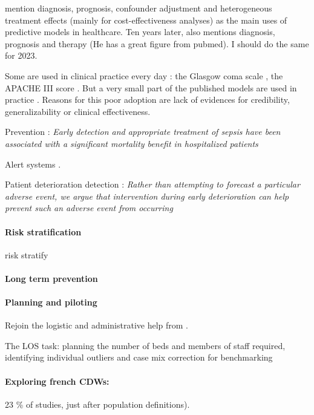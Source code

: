 \documentclass{report}
\begin{document}
\cite{harrell2001regression} mention diagnosis, prognosis, confounder adjustment
and heterogeneous treatment effects (mainly for cost-effectiveness analyses) as
the main uses of predictive models in healthcare. Ten years later,
\cite{steyerberg2009applications} also mentions diagnosis, prognosis and therapy
(He has a great figure from pubmed). I should do the same for 2023.

Some are used in clinical practice every day : the Glasgow coma scale
\citep{teasdale1974assessment}, the APACHE III score \citep{knaus1991apache}.
But a very small part of the published models are used in practice
\citep{wyatt1995commentary}. Reasons for this poor adoption are lack of
evidences for credibility, generalizability or clinical effectiveness.

Prevention : \textit{Early detection and appropriate treatment of sepsis have
  been associated with a significant mortality benefit in hospitalized patients}
\citep{wong2021external}

Alert systems \citep{yu2018artificial}.

Patient deterioration detection \citep{rothman2013development}: \textit{Rather than attempting to forecast a particular
  adverse event, we argue that intervention during early deterioration can help prevent such an adverse event from
  occurring}

\paragraph{Risk stratification}

risk stratify \citep{tang2007global}

\paragraph{Long term prevention}


\paragraph{Planning and piloting}

Rejoin the logistic and administrative help from \cite{topol2019high}.

The LOS task: planning the number of beds and members of staff required,
identifying individual outliers and case mix correction for benchmarking \citep{verburg2017models}

\paragraph{Exploring french CDWs:} 23 \% of studies, just after population definitions).
\end{document}
